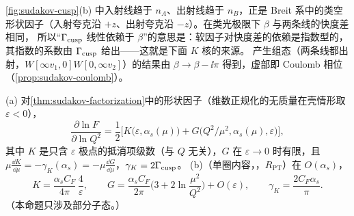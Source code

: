 \cref{fig:sudakov-cusp}(b) 中入射线趋于 $n_A$、出射线趋于 $n_B$，正是 Breit 系中的类空形状因子（入射夸克沿 $+z$、出射夸克沿 $-z$）。在类光极限下 $\beta$ 与两条线的快度差相同，
所以“$\Gamma_{\rm cusp}$ 线性依赖于 $\beta$”的意思是：软因子对快度差的依赖是指数型的，其指数的系数由 $\Gamma_{\rm cusp}$ 给出——这就是下面 $K$ 核的来源。
产生组态（两条线都出射，$W[\infty v_1,0]W[0,\infty v_2]$）的结果由 $\beta\to\beta-\ii\pi$ 得到，虚部即 Coulomb 相位（\cref{prop:sudakov-coulomb}）。

\begin{proposition}\label{prop:sudakov-kg}
(a) 对\cref{thm:sudakov-factorization}中的形状因子（维数正规化的无质量在壳情形取 $\varepsilon<0$），
\begin{equation}\label{eq:sudakov-KG}
\frac{\partial\ln F}{\partial\ln Q^2}=\frac12\Big[K\big(\varepsilon,\alpha_s(\mu)\big)+G\big(Q^2/\mu^2,\alpha_s(\mu),\varepsilon\big)\Big],
\end{equation}
其中 $K$ 是只含 $\varepsilon$ 极点的抵消项级数（与 $Q$ 无关），$G$ 在 $\varepsilon\to0$ 时有限，且
$\mu\frac{\dd K}{\dd\mu}=-\gamma_K(\alpha_s)=-\mu\frac{\dd G}{\dd\mu}$，$\gamma_K=2\Gamma_{\rm cusp}$。
(b)（单圈内容，\tagR，$R_{\mathrm{PT}}$）在 $O(\alpha_s)$，
\begin{equation}\label{eq:sudakov-KG-1loop}
K=\frac{\alpha_sC_F}{4\pi}\,\frac4\varepsilon,\qquad G=\frac{\alpha_sC_F}{2\pi}\Big(3+2\ln\frac{\mu^2}{Q^2}\Big)+O(\varepsilon),\qquad
\gamma_K=\frac{2C_F\alpha_s}{\pi}.
\end{equation}
（本命题只涉及部分子态。）
\end{proposition}

